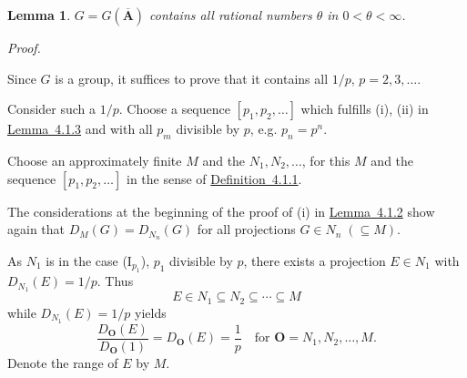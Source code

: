 \documentclass[b5paper,twoside]{article}
\newcommand{\lemref}[2]{\hyperref[#1]{\mbox{Lemma~#2}}}
\newcommand{\defref}[2]{\hyperref[#1]{\mbox{Definition~#2}}}
\theoremstyle{mvnplain}
\newtheorem{lemma}{Lemma}[section]
\renewenvironment{proof}[1][Proof]{%
  \par\addvspace{0.35\baselineskip}%
  \noindent\textit{#1.}\ \normalfont\ignorespaces
}{%
  \par\addvspace{0.35\baselineskip}%
}
\newcommand{\M}{\mathbf M}
\newcommand{\N}{\mathbf N}
\def\M{M}%
\def\N{N}%
\def\mathfrak#1{#1}%
\begin{document}
\begin{lemma}\label{lem:4.8.2}
\(\mathfrak G=\mathfrak G(\overline{\mathbf A})\) contains all rational
numbers \(\theta\) in \(0<\theta<\infty\).
\end{lemma}

\begin{proof}
Since \(\mathfrak G\) is a group, it suffices to prove that it contains all
\(1/p\), \(p=2,3,\ldots\).

Consider such a \(1/p\). Choose a sequence \([p_1,p_2,\ldots]\) which
fulfills (i), (ii) in \lemref{lem:4.1.3}{4.1.3} and with all \(p_m\) divisible
by \(p\), e.g. \(p_n=p^n\).

Choose an approximately finite \(\M\) and the \(\N_1,\N_2,\ldots\), for this
\(\M\) and the sequence \([p_1,p_2,\ldots]\) in the sense of
\defref{def:4.1.1}{4.1.1}.

The considerations at the beginning of the proof of (i) in
\lemref{lem:4.1.2}{4.1.2} show again that
\(D_{\M}(G)=D_{\N_n}(G)\) for all projections \(G\in\N_n\;(\subseteq\M)\).

As \(\N_1\) is in the case (I\(_{p_1}\)), \(p_1\) divisible by \(p\), there
exists a projection \(E\in\N_1\) with \(D_{\N_1}(E)=1/p\). Thus
\begin{equation}\tag{4.8.\(\alpha\)}\label{eq:4.8-alpha}
 E\in\N_1\subseteq\N_2\subseteq\cdots\subseteq\M
\end{equation}
while \(D_{\N_1}(E)=1/p\) yields
\begin{equation}\tag{4.8.\(\beta\)}\label{eq:4.8-beta}
 \frac{D_{\mathbf O}(E)}{D_{\mathbf O}(1)}=D_{\mathbf O}(E)=\frac1p
 \quad\text{for }\mathbf O=\N_1,\N_2,\ldots,\M.
\end{equation}
Denote the range of \(E\) by \(\mathfrak M\).


\end{proof}
\end{document}
